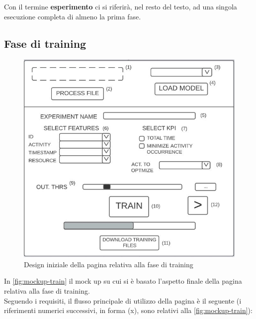 Con il termine \textbf{esperimento} ci si riferirà, nel resto del testo, ad una singola esecuzione completa di almeno la prima fase.

\subsection{Fase di training}
\label{subsec:training-phase}

\begin{figure}[H] 
    \centering 
    \includegraphics[width=0.9\columnwidth]{immagini/mockup-train.jpg} 
    \caption{Design iniziale della pagina relativa alla fase di training}
    \label{fig:mockup-train}
\end{figure}

In \autoref{fig:mockup-train} il mock up su cui si è basato l'aspetto finale della pagina relativa alla fase di training.
\\
Seguendo i requisiti, il flusso principale di utilizzo della pagina è il seguente (i riferimenti numerici successivi, in forma (x), sono relativi alla \autoref{fig:mockup-train}):

